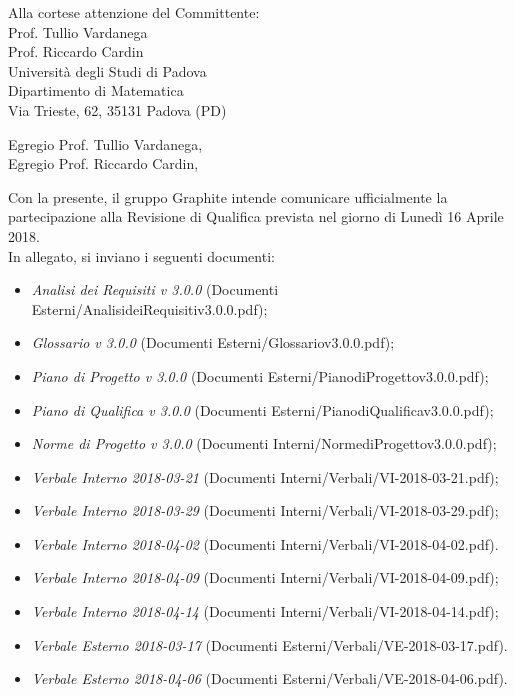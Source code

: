 \documentclass[]{letter}
\begin{document}
\begin{letter}{
		Alla cortese attenzione del Committente: \\
		Prof. Tullio Vardanega \\
		Prof. Riccardo Cardin \\
		Università degli Studi di Padova \\
		Dipartimento di Matematica \\ 
		Via Trieste, 62, 35131 Padova (PD)
	}

\opening{Egregio Prof. Tullio Vardanega, \\ Egregio Prof. Riccardo Cardin,}

\noindent Con la presente, il gruppo Graphite intende comunicare ufficialmente la partecipazione alla Revisione di Qualifica prevista nel giorno di Lunedì 16 Aprile 2018.\\
In allegato, si inviano i seguenti documenti:

\begin{itemize}
	\item \textit{Analisi dei Requisiti v 3.0.0} (Documenti Esterni/AnalisideiRequisitiv3.0.0.pdf);
	\item \textit{Glossario v 3.0.0} (Documenti Esterni/Glossariov3.0.0.pdf);
	\item \textit{Piano di Progetto v 3.0.0} (Documenti Esterni/PianodiProgettov3.0.0.pdf);
	\item \textit{Piano di Qualifica v 3.0.0} (Documenti Esterni/PianodiQualificav3.0.0.pdf);
	\item \textit{Norme di Progetto v 3.0.0} (Documenti Interni/NormediProgettov3.0.0.pdf);
	
	\item \textit{Verbale Interno 2018-03-21} (Documenti Interni/Verbali/VI-2018-03-21.pdf);
	\item \textit{Verbale Interno 2018-03-29} (Documenti Interni/Verbali/VI-2018-03-29.pdf);
	\item \textit{Verbale Interno 2018-04-02} (Documenti Interni/Verbali/VI-2018-04-02.pdf).
	\item \textit{Verbale Interno 2018-04-09} (Documenti Interni/Verbali/VI-2018-04-09.pdf);
	\item \textit{Verbale Interno 2018-04-14} (Documenti Interni/Verbali/VI-2018-04-14.pdf);
	
	\item \textit{Verbale Esterno 2018-03-17} (Documenti Esterni/Verbali/VE-2018-03-17.pdf).
	\item \textit{Verbale Esterno 2018-04-06} (Documenti Esterni/Verbali/VE-2018-04-06.pdf).
\end{itemize}


\end{letter}
\end{document}
